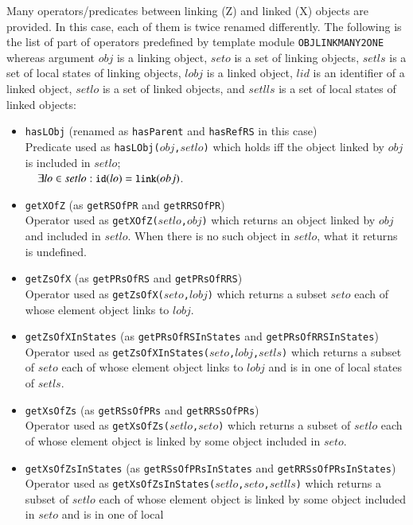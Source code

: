 \documentclass[12pt]{report}
\newcommand{\mbstt}[1]{\mbox{\small{\tt {#1}}}}
\newcommand{\stt}[1]{{\small{\tt {#1}}}}
\begin{document}
Many operators/predicates between linking (Z) and linked (X) objects
are provided. In this case, each of them is twice renamed differently.
The following is the list of part of operators predefined by template
module {\tt OBJLINKMANY2ONE} whereas argument $obj$ is a linking
object, $seto$ is a set of linking objects, $setls$ is a set of local
states of linking objects, $lobj$ is a linked object, $lid$ is an
identifier of a linked object, $setlo$ is a set of linked objects, and
$setlls$ is a set of local states of linked objects:
\begin{itemize}
\item \stt{hasLObj} (renamed as \stt{hasParent} and \stt{hasRefRS} in this case)\\
  Predicate used as \stt{hasLObj($obj$,$setlo$)} which holds iff
  the object linked by $obj$ is included in $setlo$;\\$~~~~\exists lo\in
  setlo:\mbstt{id}(lo)=\mbstt{link}(obj)$.
\item \stt{getXOfZ} (as \stt{getRSOfPR} and \stt{getRRSOfPR})\\
  Operator used as \stt{getXOfZ($setlo$,$obj$)} which returns an
  object linked by $obj$ and included in $setlo$. When there is no such
  object in $setlo$, what it returns is undefined.
\item \stt{getZsOfX} (as \stt{getPRsOfRS} and \stt{getPRsOfRRS})\\
  Operator used as \stt{getZsOfX($seto$,$lobj$)} which returns a subset
  $seto$ each of whose element object links to $lobj$.
\item \stt{getZsOfXInStates} (as \stt{getPRsOfRSInStates} and \stt{getPRsOfRRSInStates})\\
  Operator used as \stt{getZsOfXInStates($seto$,$lobj$,$setls$)} which
  returns a subset of $seto$ each of whose element object links to
  $lobj$ and is in one of local states of $setls$.
\item \stt{getXsOfZs} (as \stt{getRSsOfPRs} and \stt{getRRSsOfPRs})\\
  Operator used as \stt{getXsOfZs($setlo$,$seto$)} which returns a
  subset of $setlo$ each of whose element object is linked by some
  object included in $seto$.
\item \stt{getXsOfZsInStates} (as \stt{getRSsOfPRsInStates} and \stt{getRRSsOfPRsInStates})\\
  Operator used as \stt{getXsOfZsInStates($setlo$,$seto$,$setlls$)}
  which returns a subset of $setlo$ each of whose element object is
  linked by some object included in $seto$ and is in one of local

\end{itemize}
\end{document}

